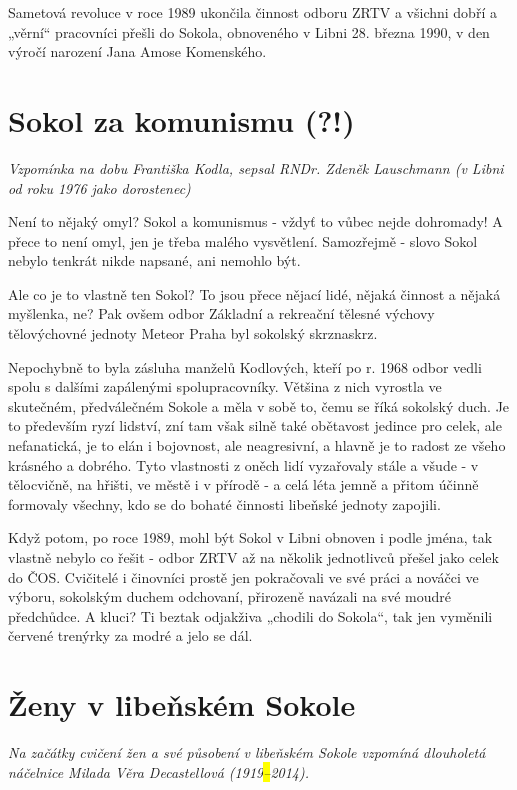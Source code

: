 Sametová revoluce v roce 1989 ukončila činnost odboru ZRTV a všichni
dobří a „věrní`` pracovníci přešli do Sokola, obnoveného v Libni 28.
března 1990, v den výročí narození Jana Amose Komenského.

\section{Sokol za komunismu (?!)}\label{sokol-za-komunismu}

\emph{Vzpomínka na dobu Františka Kodla, sepsal RNDr. Zdeněk Lauschmann
(v Libni od roku 1976 jako dorostenec)}

Není to nějaký omyl? Sokol a komunismus - vždyť to vůbec nejde
dohromady! A přece to není omyl, jen je třeba malého vysvětlení.
Samozřejmě - slovo Sokol nebylo tenkrát nikde napsané, ani nemohlo být.

Ale co je to vlastně ten Sokol? To jsou přece nějací lidé, nějaká
činnost a nějaká myšlenka, ne? Pak ovšem odbor Základní a rekreační
tělesné výchovy tělovýchovné jednoty Meteor Praha byl sokolský
skrznaskrz.

Nepochybně to byla zásluha manželů Kodlových, kteří po r. 1968 odbor
vedli spolu s dalšími zapálenými spolupracovníky. Většina z nich
vyrostla ve skutečném, předválečném Sokole a měla v sobě to, čemu se
říká sokolský duch. Je to především ryzí lidství, zní tam však silně
také obětavost jedince pro celek, ale nefanatická, je to elán i
bojovnost, ale neagresivní, a hlavně je to radost ze všeho krásného a
dobrého. Tyto vlastnosti z oněch lidí vyzařovaly stále a všude - v
tělocvičně, na hřišti, ve městě i v přírodě - a celá léta jemně a přitom
účinně formovaly všechny, kdo se do bohaté činnosti libeňské jednoty
zapojili.

Když potom, po roce 1989, mohl být Sokol v Libni obnoven i podle jména,
tak vlastně nebylo co řešit - odbor ZRTV až na několik jednotlivců
přešel jako celek do ČOS. Cvičitelé i činovníci prostě jen pokračovali
ve své práci a nováčci ve výboru, sokolským duchem odchovaní, přirozeně
navázali na své moudré předchůdce. A kluci? Ti beztak odjakživa „chodili
do Sokola``, tak jen vyměnili červené trenýrky za modré a jelo se dál.

\section{Ženy v libeňském
Sokole}\label{ux17eeny-v-libeux148skuxe9m-sokole}

\emph{Na začátky cvičení žen a své působení v libeňském Sokole vzpomíná
dlouholetá náčelnice Milada Věra Decastellová (1919\hl{--}2014).}

